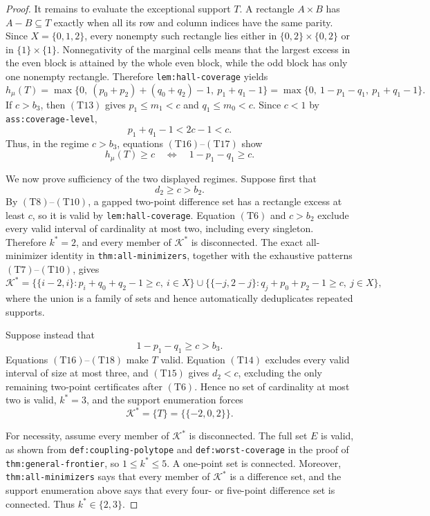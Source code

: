 \documentclass{article}
\begin{document}
\begin{proof}
It remains to evaluate the exceptional support \(T\).  A rectangle \(A\times B\) has \(A-B\subseteq T\) exactly when all its row and column indices have the same parity.  Since \(X=\{0,1,2\}\), every nonempty such rectangle lies either in \(\{0,2\}\times\{0,2\}\) or in \(\{1\}\times\{1\}\).  Nonnegativity of the marginal cells means that the largest excess in the even block is attained by the whole even block, while the odd block has only one nonempty rectangle.  Therefore \texttt{lem:hall-coverage} yields
\[
h_\mu(T)
=\max\{0,\ (p_0+p_2)+(q_0+q_2)-1,\ p_1+q_1-1\}
=\max\{0,\ 1-p_1-q_1,\ p_1+q_1-1\}.
\tag{T16}
\]
If \(c>b_3\), then \((\mathrm{T13})\) gives \(p_1\leq m_1<c\) and \(q_1\leq m_0<c\).  Since \(c<1\) by \texttt{ass:coverage-level},
\[
p_1+q_1-1<2c-1<c.
\tag{T17}
\]
Thus, in the regime \(c>b_3\), equations \((\mathrm{T16})\)--\((\mathrm{T17})\) show
\[
h_\mu(T)\geq c
\quad\Longleftrightarrow\quad 1-p_1-q_1\geq c.
\tag{T18}
\]

We now prove sufficiency of the two displayed regimes.  Suppose first that
\[
d_2\geq c>b_2.
\tag{T19}
\]
By \((\mathrm{T8})\)--\((\mathrm{T10})\), a gapped two-point difference set has a rectangle excess at least \(c\), so it is valid by \texttt{lem:hall-coverage}.  Equation \((\mathrm{T6})\) and \(c>b_2\) exclude every valid interval of cardinality at most two, including every singleton.  Therefore \(k^*=2\), and every member of \(\mathcal K^*\) is disconnected.  The exact all-minimizer identity in \texttt{thm:all-minimizers}, together with the exhaustive patterns \((\mathrm{T7})\)--\((\mathrm{T10})\), gives
\[
\mathcal K^*
=\bigl\{\{i-2,i\}:p_i+q_0+q_2-1\geq c,\ i\in X\bigr\}
\mathbin{\cup}
\bigl\{\{-j,2-j\}:q_j+p_0+p_2-1\geq c,\ j\in X\bigr\},
\tag{T20}
\]
where the union is a family of sets and hence automatically deduplicates repeated supports.

Suppose instead that
\[
1-p_1-q_1\geq c>b_3.
\tag{T21}
\]
Equations \((\mathrm{T16})\)--\((\mathrm{T18})\) make \(T\) valid.  Equation \((\mathrm{T14})\) excludes every valid interval of size at most three, and \((\mathrm{T15})\) gives \(d_2<c\), excluding the only remaining two-point certificates after \((\mathrm{T6})\).  Hence no set of cardinality at most two is valid, \(k^*=3\), and the support enumeration forces
\[
\mathcal K^*=\{T\}=\bigl\{\{-2,0,2\}\bigr\}.
\tag{T22}
\]

For necessity, assume every member of \(\mathcal K^*\) is disconnected.  The full set \(E\) is valid, as shown from \texttt{def:coupling-polytope} and \texttt{def:worst-coverage} in the proof of \texttt{thm:general-frontier}, so \(1\leq k^*\leq5\).  A one-point set is connected.  Moreover, \texttt{thm:all-minimizers} says that every member of \(\mathcal K^*\) is a difference set, and the support enumeration above says that every four- or five-point difference set is connected.  Thus \(k^*\in\{2,3\}\).


\end{proof}
\end{document}
